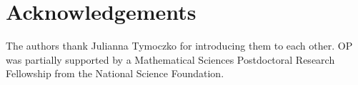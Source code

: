\documentclass[12pt]{amsart}
\theoremstyle{definition}
\theoremstyle{remark}
\numberwithin{equation}{section}
\begin{document}
\section*{Acknowledgements}
The authors thank Julianna Tymoczko for introducing them to each other. OP was partially supported by a Mathematical Sciences Postdoctoral Research Fellowship from the National Science Foundation.


%
%


 

\end{document}
